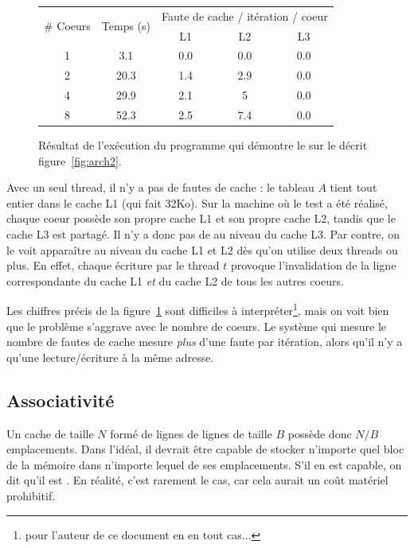 \begin{figure}
\begin{center}
\begin{tabular}{|c|c|c|c|c|}
  \hline
  \multirow{2}{*}{\# Coeurs} & \multirow{2}{*}{Temps (s)} & \multicolumn{3}{c|}{Faute de cache / itération / coeur} \\
  \cline{3-5}
                             &           & L1   & L2   & L3 \\
  \hline\hline
  1         &   3.1     & 0.0  & 0.0  & 0.0 \\
\hline
  2         &  20.3     & 1.4  & 2.9  & 0.0 \\
\hline
  4         &  29.9     & 2.1  & 5    & 0.0 \\
\hline
  8         &  52.3     & 2.5  & 7.4  & 0.0 \\
\hline
\end{tabular}
\end{center}
\caption{Résultat de l'exécution du programme qui démontre le  sur le  décrit figure~\ref{fig:arch2}. \label{fig:false-sharing}}
\end{figure}

Avec un seul thread, il n'y a pas de fautes de cache : le tableau $A$ tient tout
entier dans le cache L1 (qui fait 32Ko). Sur la machine où le test a été
réalisé, chaque coeur possède son propre cache L1 et son propre cache L2, tandis
que le cache L3 est partagé. Il n'y a donc pas de  au
niveau du cache L3. Par contre, on le voit apparaître au niveau du cache L1 et
L2 dès qu'on utilise deux threads ou plus. En effet, chaque écriture par le
thread $t$ provoque l'invalidation de la ligne correspondante du cache L1
\emph{et} du cache L2 de tous les autres coeurs.

Les chiffres précis de la figure~\ref{fig:false-sharing} sont difficiles à
interpréter\footnote{pour l'auteur de ce document en en tout cas...}, mais on
voit bien que le problème s'aggrave avec le nombre de coeurs. Le système qui
mesure le nombre de fautes de cache mesure \emph{plus} d'une faute par
itération, alors qu'il n'y a qu'une lecture/écriture à la même adresse.

\subsection{Associativité}

Un cache de taille $N$ formé de lignes de lignes de taille $B$ possède donc
$N/B$ \og emplacements\fg. Dans l'idéal, il devrait être capable de stocker
n'importe quel bloc de la mémoire dans n'importe lequel de ses
emplacements. S'il en est capable, on dit qu'il est . En réalité, c'est rarement le cas, car cela aurait un coût
matériel prohibitif.

